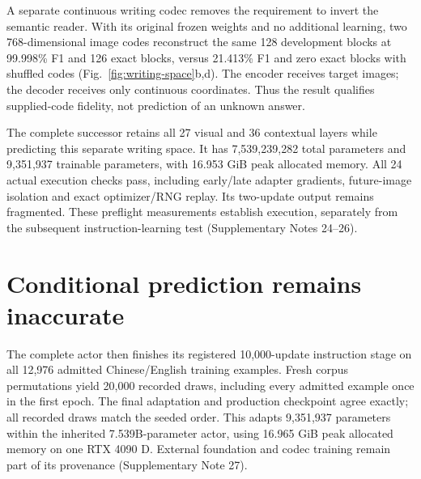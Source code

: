 A separate continuous writing codec removes the requirement to invert the
semantic reader. With its original frozen weights and no additional learning,
two 768-dimensional image codes reconstruct the same 128 development blocks
at 99.998\% F1 and 126 exact blocks, versus 21.413\% F1 and zero exact blocks
with shuffled codes (Fig.~\ref{fig:writing-space}b,d). The encoder receives
target images; the decoder receives only continuous coordinates. Thus the
result qualifies supplied-code fidelity, not prediction of an unknown answer.

The complete successor retains all 27 visual and 36 contextual layers while
predicting this separate writing space. It has 7,539,239,282 total parameters
and 9,351,937 trainable parameters, with 16.953 GiB peak allocated memory.
All 24 actual execution checks pass, including early/late adapter gradients,
future-image isolation and exact optimizer/RNG replay. Its two-update
output remains fragmented. These preflight measurements establish execution,
separately from the subsequent instruction-learning test
(Supplementary Notes 24--26).


\section*{Conditional prediction remains inaccurate}
The complete actor then finishes its registered 10,000-update instruction
stage on all 12,976 admitted Chinese/English training examples. Fresh corpus
permutations yield 20,000 recorded draws, including every admitted example
once in the first epoch. The final adaptation and production checkpoint
agree exactly; all recorded draws match the seeded order. This adapts
9,351,937 parameters within the inherited 7.539B-parameter actor, using
16.965 GiB peak allocated memory on one RTX 4090 D. External foundation and
codec training remain part of its provenance (Supplementary Note 27).


